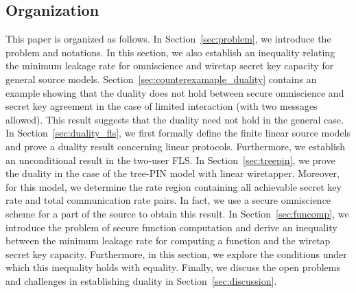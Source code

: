 \subsection{Organization}
This paper is organized as follows. In Section~\ref{sec:problem}, we introduce the problem and notations. In this section, we also establish an inequality relating the minimum leakage rate for omniscience and wiretap secret key capacity for general source models. Section~\ref{sec:counterexamaple_duality} contains an example showing that the duality does not hold between secure omniscience and secret key agreement in the case of limited interaction (with two messages allowed). This result suggests that the duality need not hold in the general case. In Section~\ref{sec:duality_fls}, we first formally define the finite linear source models and prove a duality result concerning linear protocols. Furthermore, we establish an unconditional result in the two-user FLS. In Section~\ref{sec:treepin}, we prove the duality in the case of the tree-PIN model with linear wiretapper. Moreover, for this model,  we determine the rate region containing all achievable secret key rate and total communication rate pairs. In fact, we use a secure omniscience scheme for a part of the source to obtain this result. 
{ In Section~\ref{sec:funcomp}, we introduce the problem of secure function computation and derive an inequality between the minimum leakage rate for computing a function and the wiretap secret key capacity. Furthermore, in this section, we explore the conditions under which this inequality holds with equality.} Finally, we discuss the open problems and challenges in establishing duality in Section~\ref{sec:discussion}.



